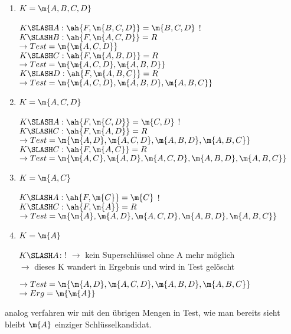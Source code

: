 \documentclass{lehramt-informatik-haupt}
\begin{document}
\begin{enumerate}


\item $K = \m{A, B, C, D}$

$K \SLASH A: \ah{F, \m{B, C, D}} = \m{B, C, D}$ !\\

$K \SLASH B: \ah{F, \m{A, C, D}} = R$\\
$\rightarrow Test = \m{\m{A, C, D}}$ \\

$K \SLASH C: \ah{F, \m{A, B, D}} = R$\\
$\rightarrow Test = \m{\m{A, C, D}, \m{A, B, D}}$ \\

$K \SLASH D: \ah{F, \m{A, B, C}} = R$\\
$\rightarrow Test = \m{\m{A, C, D}, \m{A, B, D}, \m{A, B, C}}$ \\


\item $K = \m{A, C, D}$

$K \SLASH A: \ah{F, \m{C, D}} = \m{C, D}$ !\\

$K \SLASH C: \ah{F, \m{A, D}} = R$\\
$\rightarrow Test = \m{\m{A, D}, \m{A, C, D}, \m{A, B, D}, \m{A, B, C}}$ \\

$K \SLASH C: \ah{F, \m{A, C}} = R$\\
$\rightarrow Test = \m{\m{A, C}, \m{A, D}, \m{A, C, D}, \m{A, B, D}, \m{A, B, C}}$ \\


\item $K = \m{A, C}$

$K \SLASH A: \ah{F, \m{C}} = \m{C}$ !\\

$K \SLASH C: \ah{F, \m{A}} = R$\\
$\rightarrow Test = \m{\m{A}, \m{A, D}, \m{A, C, D}, \m{A, B, D}, \m{A, B, C}}$ \\


\item $K = \m{A}$

$K \SLASH A$: ! $\rightarrow$ kein Superschlüssel ohne A mehr möglich\\
$\rightarrow$ dieses K wandert in Ergebnis und wird in Test gelöscht

$\rightarrow Test = \m{\m{A, D}, \m{A, C, D}, \m{A, B, D}, \m{A, B, C}}$ \\
$\rightarrow Erg = \m{\m{A}}$ \\
\end{enumerate}

analog verfahren wir mit den übrigen Mengen in Test, wie man bereits
sieht bleibt $\m{A}$ einziger Schlüsselkandidat.

\literatur
\end{document}
